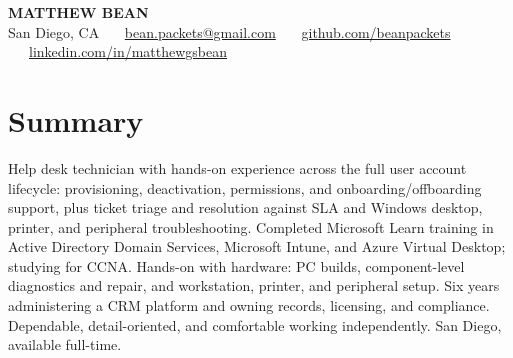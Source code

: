 \documentclass[letterpaper,10.5pt]{article}
\begin{document}
\begin{center}
  {\LARGE\bfseries MATTHEW BEAN}\\[5pt]
  {\small
    San Diego, CA \ \textbullet\ \
    \href{mailto:bean.packets@gmail.com}{bean.packets@gmail.com} \ \textbullet\ \
    \href{https://github.com/beanpackets}{github.com/beanpackets} \ \textbullet\ \
    \href{https://www.linkedin.com/in/matthewgsbean}{linkedin.com/in/matthewgsbean}
  }
\end{center}
\vspace{2pt}

\section*{Summary}
Help desk technician with hands-on experience across the full user account lifecycle: provisioning,
deactivation, permissions, and onboarding/offboarding support, plus ticket triage and resolution
against SLA and Windows desktop, printer, and peripheral troubleshooting. Completed Microsoft Learn
training in Active Directory Domain Services, Microsoft Intune, and Azure Virtual Desktop; studying
for CCNA. Hands-on with hardware: PC builds, component-level diagnostics and repair, and workstation,
printer, and peripheral setup. Six years administering a CRM platform and owning records, licensing,
and compliance.\\
Dependable, detail-oriented, and comfortable working independently. San Diego, available full-time.

\end{document}
